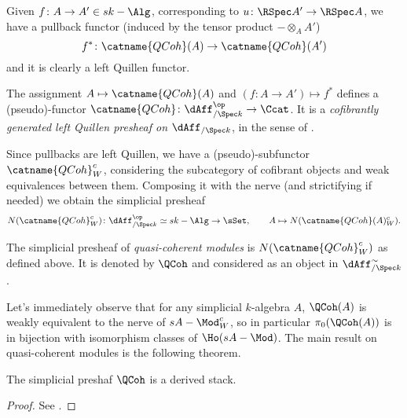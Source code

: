             Given $f\colon A \to A' \in sk-\Alg$, corresponding to $u\colon \RSpec A' \to \RSpec A$, we have a pullback functor (induced by the tensor product $- \otimes_A A'$) \[f^*\colon \catname{QCoh}(A) \to \catname{QCoh}(A') \] and it is clearly a left Quillen functor.            
            \begin{defn}
                \label{defn:quasi_coherent_model_sheaf}
                The assignment $A \mapsto \catname{QCoh}(A)$ and $(f\colon A \to A') \mapsto f^*$ defines a (pseudo)-functor $\catname{QCoh}\colon \dAff_{/\Spec k}^{\op} \to \Ccat$. It is a \emph{cofibrantly generated left Quillen presheaf on $\dAff_{/\Spec k}$}, in the sense of \cite[Appendix~B]{ToVe:hag2}.
            \end{defn}
            Since pullbacks are left Quillen, we have a (pseudo)-subfunctor $\catname{QCoh}^c_W$, considering the subcategory of cofibrant objects and weak equivalences between them. Composing it with the nerve (and strictifying if needed) we obtain the simplicial presheaf \[N(\catname{QCoh}^c_W)\colon \dAff_{/\Spec k}^{\op} \simeq sk-\Alg \to \sSet, \qquad A \mapsto N(\catname{QCoh}(A)^c_W). \]
            \begin{defn}
                \label{defn:stack_quasi_coherent}
                The simplicial presheaf of \emph{quasi-coherent modules} is $N(\catname{QCoh}^c_W)$ as defined above. It is denoted by $\QCoh$ and considered as an object in $\dAff_{/\Spec k}^{\sim}$.
            \end{defn}
            Let's immediately observe that for any simplicial $k$-algebra $A$, $\QCoh(A)$ is weakly equivalent to the nerve of $sA-\Mod^c_W$, so in particular $\pi_0(\QCoh(A))$ is in bijection with isomorphism classes of $\Ho(sA-\Mod)$.
            The main result on quasi-coherent modules is the following theorem.
            \begin{thm}
                \label{thm:qcoh_is_stack}
                The simplicial preshaf $\QCoh$ is a derived stack.
            \end{thm}
            \begin{proof}
                See \cite[Theorem~1.3.7.2]{ToVe:hag2}.
            \end{proof}

